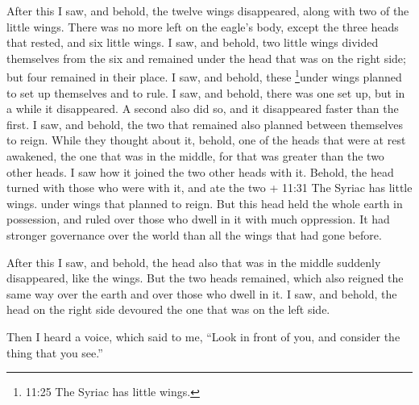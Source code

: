  After this I saw, and behold, the twelve wings
disappeared, along with two of the little wings.  There was
no more left on the eagle's body, except the three heads that rested,
and six little wings.  I saw, and behold, two little wings
divided themselves from the six and remained under the head that was on
the right side; but four remained in their place.  I saw,
and behold, these \footnote{11:25 The Syriac has little wings.}under
wings planned to set up themselves and to rule.  I saw, and
behold, there was one set up, but in a while it disappeared.
 A second also did so, and it disappeared faster than the
first.  I saw, and behold, the two that remained also
planned between themselves to reign.  While they thought
about it, behold, one of the heads that were at rest awakened, the one
that was in the middle, for that was greater than the two other heads.
 I saw how it joined the two other heads with it.
 Behold, the head turned with those who were with it, and
ate the two + 11:31 The Syriac has little wings. under wings that
planned to reign.  But this head held the whole earth in
possession, and ruled over those who dwell in it with much oppression.
It had stronger governance over the world than all the wings that had
gone before.

 After this I saw, and behold, the head also that was in
the middle suddenly disappeared, like the wings.  But the
two heads remained, which also reigned the same way over the earth and
over those who dwell in it.  I saw, and behold, the head on
the right side devoured the one that was on the left side.

 Then I heard a voice, which said to me, ``Look in front of
you, and consider the thing that you see.''

